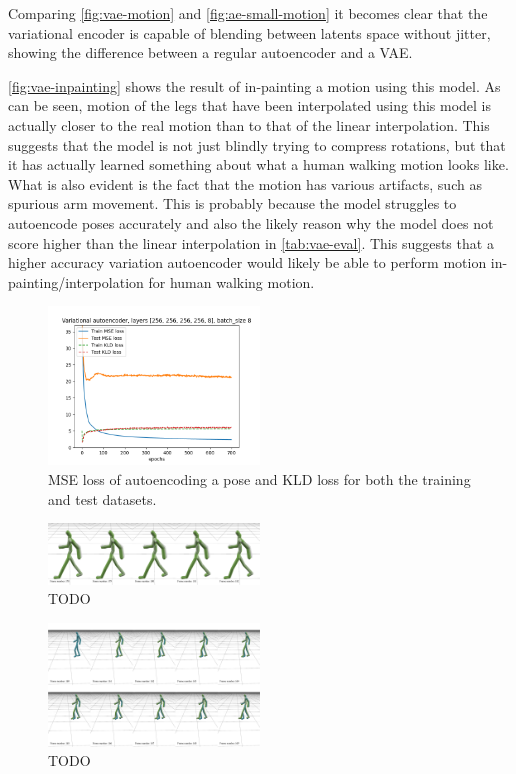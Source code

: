 Comparing \autoref{fig:vae-motion} and \autoref{fig:ae-small-motion} it becomes clear that the variational encoder is capable of blending between latents space without jitter, showing the difference between a regular autoencoder and a VAE.

\autoref{fig:vae-inpainting} shows the result of in-painting a motion using this model. As can be seen, motion of the legs that have been interpolated using this model is actually closer to the real motion than to that of the linear interpolation. This suggests that the model is not just blindly trying to compress rotations, but that it has actually learned something about what a human walking motion looks like. What is also evident is the fact that the motion has various artifacts, such as spurious arm movement. This is probably because the model struggles to autoencode poses accurately and also the likely reason why the model does not score higher than the linear interpolation in \autoref{tab:vae-eval}. This suggests that a higher accuracy variation autoencoder would likely be able to perform motion in-painting/interpolation for human walking motion.

\begin{figure}[h]
\centering
\includegraphics[width=0.5\textwidth]{img/vae_256-256-256-256-8_batch-8_losses}
\caption{MSE loss of autoencoding a pose and KLD loss for both the training and test datasets.}
\label{fig:vae-loss}
\end{figure}

\begin{figure}[h]
\centering
\includegraphics[width=0.5\textwidth]{img/vae-motion}
\caption{TODO}
\label{fig:vae-motion}
\end{figure}

\begin{figure}[h]
\centering
\includegraphics[width=0.5\textwidth]{img/vae-inpainting}
\caption{TODO}
\label{fig:vae-inpainting}
\end{figure}

